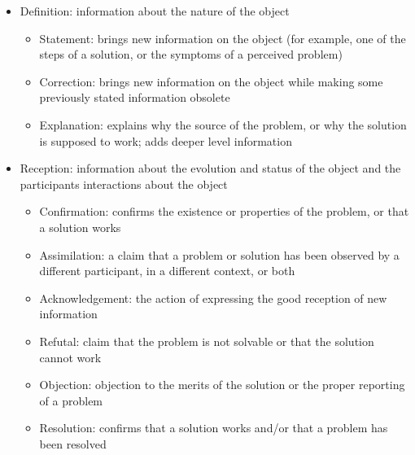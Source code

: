 \documentclass[11pt]{article}
\begin{document}
\begin{itemize}
	\item Definition: information about the nature of the object
		\begin{itemize}
			\item Statement: brings new information on the object (for example, one of the steps of a solution, or the symptoms of a perceived problem)
			\item Correction: brings new information on the object while making some previously stated information obsolete
			\item Explanation: explains why the source of the problem, or why the solution is supposed to work; adds deeper level information
		\end{itemize}
	\item Reception: information about the evolution and status of the object and the participants interactions about the object
		\begin{itemize}
			\item Confirmation: confirms the existence or properties of the problem, or that a solution works
			\item Assimilation: a claim that a problem or solution has been observed by a different participant, in a different context, or both
			\item Acknowledgement: the action of expressing the good reception of new information
			\item Refutal: claim that the problem is not solvable or that the solution cannot work
			\item Objection: objection to the merits of the solution or the proper reporting of a problem
			\item Resolution: confirms that a solution works and/or that a problem has been resolved
		\end{itemize}
\end{itemize}



\end{document}
